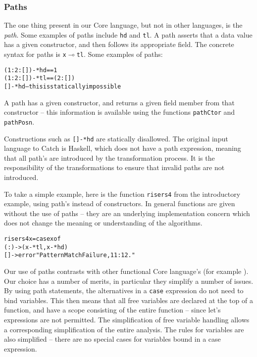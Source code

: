 \documentclass[preprint]{sigplanconf}
\newcommand{\T}[1]{\texttt{#1}}
\newenvironment{code}{\begin{alltt}\small}{\end{alltt}}
\begin{document}
\subsubsection{Paths}

The one thing present in our Core language, but not in other languages, is the \textit{path}. Some examples of paths include \T{hd} and \T{tl}. A path asserts that a data value has a given constructor, and then follows its appropriate field. The concrete syntax for paths is \T{x$\multimap$tl}. Some examples of paths:

\begin{code}
(1:2:[])-*hd == 1
(1:2:[])-*tl == (2:[])
[]-*hd -- this is statically impossible
\end{code}

A path has a given constructor, and returns a given field member from that constructor -- this information is available using the functions \T{pathCtor} and \T{pathPosn}.

Constructions such as \T{[]-*hd} are statically disallowed. The original input language to Catch is Haskell, which does not have a path expression, meaning that all path's are introduced by the transformation process. It is the responsibility of the transformations to ensure that invalid paths are not introduced.

To take a simple example, here is the function \T{risers4} from the introductory example, using path's instead of constructors. In general functions are given without the use of paths -- they are an underlying implementation concern which does not change the meaning or understanding of the algorithms.

\begin{code}
risers4 x = case x of
    (:) -> (x-*tl, x-*hd)
    [] -> error "Pattern Match Failure, 11:12."
\end{code}

Our use of paths contrasts with other functional Core language's (for example \citet{ghc_core}). Our choice has a number of merits, in particular they simplify a number of issues. By using path statements, the alternatives in a \T{case} expression do not need to bind variables. This then means that all free variables are declared at the top of a function, and have a scope consisting of the entire function -- since let's expressions are not permitted. The simplification of free variable handling allows a corresponding simplification of the entire analysis. The rules for variables are also simplified -- there are no special cases for variables bound in a case expression.
\end{document}

